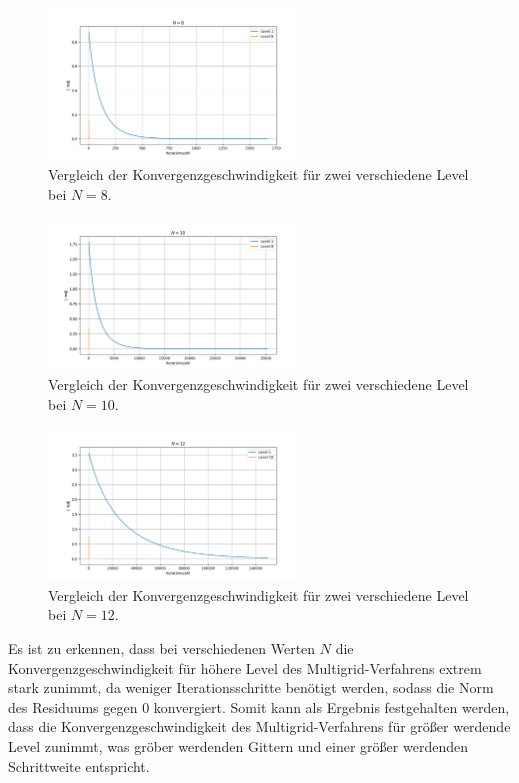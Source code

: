 \documentclass[11pt,a4paper]{article}
\begin{document}
\begin{figure}[htbp]
    \centering
    \includegraphics[width=0.6\textwidth,scale=0.7]{h2_level_comparison_n8}
    \caption[Vergleich der Konvergenzgeschwindigkeit für zwei verschiedene Level bei $N = 8$.]{Vergleich der Konvergenzgeschwindigkeit für zwei verschiedene Level bei $N = 8$.}\label{fig:h2_level_comparison_n8}
\end{figure}
\begin{figure}[htbp]
    \centering
    \includegraphics[width=0.6\textwidth,scale=0.7]{h2_level_comparison_n10}
    \caption[Vergleich der Konvergenzgeschwindigkeit für zwei verschiedene Level bei $N = 10$.]{Vergleich der Konvergenzgeschwindigkeit für zwei verschiedene Level bei $N = 10$.}\label{fig:h2_level_comparison_n10}
\end{figure}
\begin{figure}[htbp]
    \centering
    \includegraphics[width=0.6\textwidth,scale=0.7]{h2_level_comparison_n12}
    \caption[Vergleich der Konvergenzgeschwindigkeit für zwei verschiedene Level bei $N = 12$.]{Vergleich der Konvergenzgeschwindigkeit für zwei verschiedene Level bei $N = 12$.}\label{fig:h2_level_comparison_n12}
\end{figure}\newpage
\noindent Es ist zu erkennen, dass bei verschiedenen Werten $N$ die Konvergenzgeschwindigkeit für höhere Level des Multigrid-Verfahrens extrem stark zunimmt, da weniger Iterationsschritte benötigt werden, sodass die Norm des Residuums
gegen $0$ konvergiert. Somit kann als Ergebnis festgehalten werden, dass die Konvergenzgeschwindigkeit des Multigrid-Verfahrens für größer werdende Level zunimmt, was gröber werdenden Gittern und einer größer werdenden Schrittweite entspricht.

\newpage

\listoffigures
\end{document}
